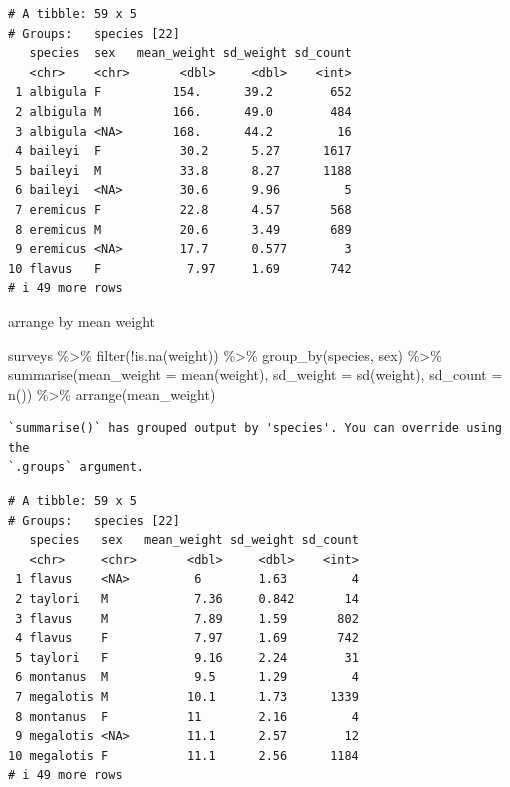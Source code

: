 \documentclass[
  letterpaper,
  DIV=11,
  numbers=noendperiod]{scrreprt}
\newenvironment{Shaded}{\begin{snugshade}}{\end{snugshade}}
\newcommand{\AttributeTok}[1]{\textcolor[rgb]{0.40,0.45,0.13}{#1}}
\newcommand{\FunctionTok}[1]{\textcolor[rgb]{0.28,0.35,0.67}{#1}}
\newcommand{\NormalTok}[1]{\textcolor[rgb]{0.00,0.23,0.31}{#1}}
\newcommand{\SpecialCharTok}[1]{\textcolor[rgb]{0.37,0.37,0.37}{#1}}
\begin{document}
\begin{verbatim}
# A tibble: 59 x 5
# Groups:   species [22]
   species  sex   mean_weight sd_weight sd_count
   <chr>    <chr>       <dbl>     <dbl>    <int>
 1 albigula F          154.      39.2        652
 2 albigula M          166.      49.0        484
 3 albigula <NA>       168.      44.2         16
 4 baileyi  F           30.2      5.27      1617
 5 baileyi  M           33.8      8.27      1188
 6 baileyi  <NA>        30.6      9.96         5
 7 eremicus F           22.8      4.57       568
 8 eremicus M           20.6      3.49       689
 9 eremicus <NA>        17.7      0.577        3
10 flavus   F            7.97     1.69       742
# i 49 more rows
\end{verbatim}

arrange by mean weight

\begin{Shaded}
\begin{Highlighting}[]
\NormalTok{surveys }\SpecialCharTok{\%\textgreater{}\%}
    \FunctionTok{filter}\NormalTok{(}\SpecialCharTok{!}\FunctionTok{is.na}\NormalTok{(weight)) }\SpecialCharTok{\%\textgreater{}\%}
    \FunctionTok{group\_by}\NormalTok{(species, sex) }\SpecialCharTok{\%\textgreater{}\%}
    \FunctionTok{summarise}\NormalTok{(}\AttributeTok{mean\_weight =} \FunctionTok{mean}\NormalTok{(weight), }\AttributeTok{sd\_weight =} \FunctionTok{sd}\NormalTok{(weight), }\AttributeTok{sd\_count =} \FunctionTok{n}\NormalTok{()) }\SpecialCharTok{\%\textgreater{}\%}
    \FunctionTok{arrange}\NormalTok{(mean\_weight)}
\end{Highlighting}
\end{Shaded}

\begin{verbatim}
`summarise()` has grouped output by 'species'. You can override using the
`.groups` argument.
\end{verbatim}

\begin{verbatim}
# A tibble: 59 x 5
# Groups:   species [22]
   species   sex   mean_weight sd_weight sd_count
   <chr>     <chr>       <dbl>     <dbl>    <int>
 1 flavus    <NA>         6        1.63         4
 2 taylori   M            7.36     0.842       14
 3 flavus    M            7.89     1.59       802
 4 flavus    F            7.97     1.69       742
 5 taylori   F            9.16     2.24        31
 6 montanus  M            9.5      1.29         4
 7 megalotis M           10.1      1.73      1339
 8 montanus  F           11        2.16         4
 9 megalotis <NA>        11.1      2.57        12
10 megalotis F           11.1      2.56      1184
# i 49 more rows
\end{verbatim}
\end{document}
